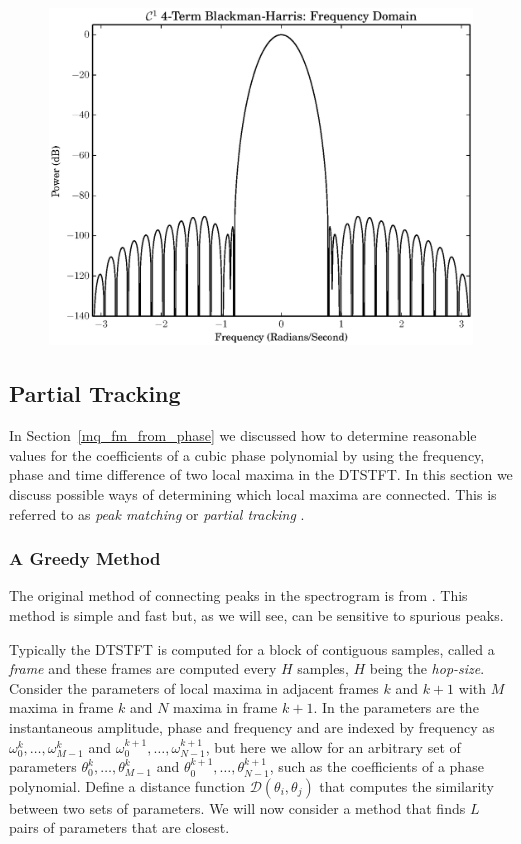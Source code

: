 \documentclass[letterpaper,12pt]{report}
\begin{document}
\begin{figure}
    \caption{}
    \includegraphics[width=\textwidth]{plots/c1_blackman_fd.eps}
\end{figure}

\subsection{Partial Tracking}

In Section~\ref{mq_fm_from_phase} we discussed how to determine reasonable
values for the coefficients of a cubic phase polynomial by using the frequency,
phase and time difference of two local maxima in the DTSTFT. In this section we
discuss possible ways of determining which local maxima are connected. This is
referred to as \textit{peak matching} \cite{mcaulay1986speech}
or \textit{partial tracking} \cite{smith1987parshl} \cite{depalle1993tracking}.

\subsubsection{A Greedy Method}

The original method of connecting peaks in the spectrogram is from
\cite{mcaulay1986speech}. This method is simple and fast but, as we will see,
can be sensitive to spurious peaks.

Typically the DTSTFT is computed for a block of contiguous samples, called a
\textit{frame} and these frames are computed every $H$ samples, $H$ being the
\textit{hop-size}. Consider the parameters of local maxima in adjacent frames
$k$ and $k+1$ with $M$ maxima in frame $k$ and $N$ maxima in frame $k+1$. In
\cite{mcaulay1986speech}  the parameters are the instantaneous amplitude, phase
and frequency and are indexed by frequency as $\omega_0^{k}, \dotsc,
\omega_{M-1}^{k}$ and $\omega_0^{k+1}, \dotsc, \omega_{N-1}^{k+1}$, but here we
allow for an arbitrary set of parameters $\theta_0^{k}, \dotsc,
\theta_{M-1}^{k}$ and $\theta_0^{k+1}, \dotsc,
\theta_{N-1}^{k+1}$, such as the coefficients of a phase polynomial. Define a
distance function $\mathcal{D} \left( \theta_{i},\theta_{j} \right)$ that computes the
similarity between two sets of parameters. We will now consider a method that
finds $L$ pairs of parameters that are closest.
\end{document}
